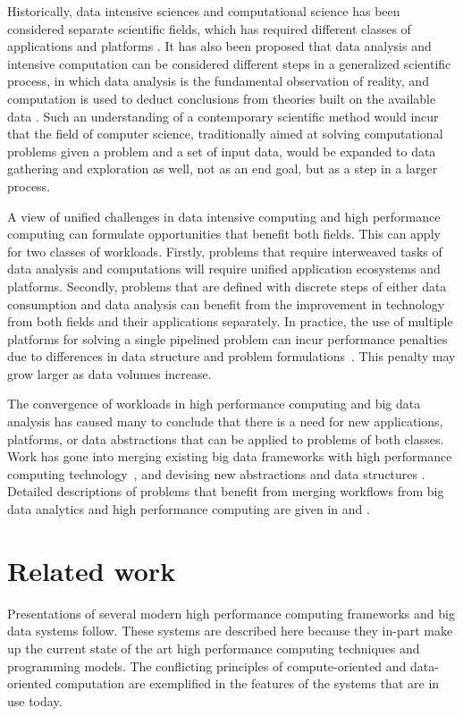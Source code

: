\documentclass{uit-report}
\begin{document}
Historically, data intensive sciences and computational science has been considered separate scientific fields, which has required different classes of applications and platforms \cite{Hey2009JimGO}. It has also been proposed that data analysis and intensive computation can be considered different steps in a generalized scientific process, in which data analysis is the fundamental observation of reality, and computation is used to deduct conclusions from theories built on the available data \cite{honavar2016accelerating}. Such an understanding of a contemporary scientific method would incur that the field of computer science, traditionally aimed at solving computational problems given a problem and a set of input data, would be expanded to data gathering and exploration as well, not as an end goal, but as a step in a larger process.

A view of unified challenges in data intensive computing and high performance computing can formulate opportunities that benefit both fields. This can apply for two classes of workloads. Firstly, problems that require interweaved tasks of data analysis and computations will require unified application ecosystems and platforms. Secondly, problems that are defined with discrete steps of either data consumption and data analysis can benefit from the improvement in technology from both fields and their applications separately. In practice, the use of multiple platforms for solving a single pipelined problem can incur performance penalties due to differences in data structure and problem formulations~\cite{husky}. This penalty may grow larger as data volumes increase.

The convergence of workloads in high performance computing and big data analysis has caused many to conclude that there is a need for new applications, platforms, or data abstractions that can be applied to problems of both classes. Work has gone into merging existing big data frameworks with high performance computing technology~\cite{bridgingthegap}\cite{gittens2016matrix}, and devising new abstractions and data structures \cite{yang2017best}. Detailed descriptions of problems that benefit from merging workflows from big data analytics and high performance computing are given in \cite{subcommittee} and \cite{bigdataconvergence}.

\section{Related work} \label{section:relatedwork}
Presentations of several modern high performance computing frameworks and big data systems follow. These systems are described here because they in-part make up the current state of the art high performance computing techniques and programming models. The conflicting principles of compute-oriented and data-oriented computation are exemplified in the features of the systems that are in use today.
\end{document}
